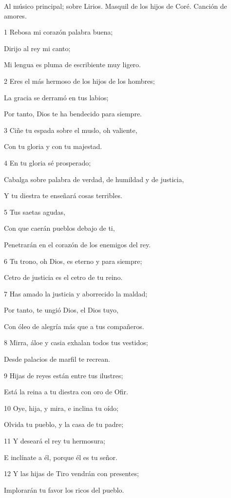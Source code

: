 \par Al músico principal; sobre Lirios. Masquil de los hijos de Coré. Canción de amores.

\par 1 Rebosa mi corazón palabra buena;
\par Dirijo al rey mi canto;
\par Mi lengua es pluma de escribiente muy ligero.
\par 2 Eres el más hermoso de los hijos de los hombres;
\par La gracia se derramó en tus labios;
\par Por tanto, Dios te ha bendecido para siempre.
\par 3 Ciñe tu espada sobre el muslo, oh valiente,
\par Con tu gloria y con tu majestad.
\par 4 En tu gloria sé prosperado;
\par Cabalga sobre palabra de verdad, de humildad y de justicia,
\par Y tu diestra te enseñará cosas terribles.
\par 5 Tus saetas agudas,
\par Con que caerán pueblos debajo de ti,
\par Penetrarán en el corazón de los enemigos del rey.
\par 6 Tu trono, oh Dios, es eterno y para siempre;
\par Cetro de justicia es el cetro de tu reino.
\par 7 Has amado la justicia y aborrecido la maldad;
\par Por tanto, te ungió Dios, el Dios tuyo,
\par Con óleo de alegría más que a tus compañeros.
\par 8 Mirra, áloe y casia exhalan todos tus vestidos;
\par Desde palacios de marfil te recrean.
\par 9 Hijas de reyes están entre tus ilustres;
\par Está la reina a tu diestra con oro de Ofir.
\par 10 Oye, hija, y mira, e inclina tu oído;
\par Olvida tu pueblo, y la casa de tu padre;
\par 11 Y deseará el rey tu hermosura;
\par E inclínate a él, porque él es tu señor.
\par 12 Y las hijas de Tiro vendrán con presentes;
\par Implorarán tu favor los ricos del pueblo.
